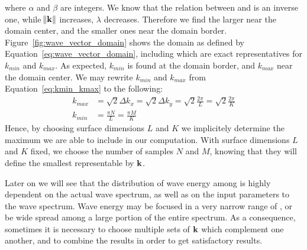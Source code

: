 where $\alpha$ and $\beta$ are integers.
%
We know that the relation between \wavelength and \wavenumber is an inverse one,
while $\norm{\mathbf{k}}$ increases, \wavelength $\lambda$ decreases. Therefore we find the larger
\wavelengths near the domain center, and the smaller ones near the domain border.
Figure~\ref{fig:wave_vector_domain} shows the \wavevector domain as defined
by Equation~\ref{eq:wave_vector_domain}, including \wavevectors which are exact
representatives for \wavenumbers $k_{min}$ and $k_{max}$. As expected, $k_{min}$
is found at the domain border, and $k_{max}$ near the domain center.
We may rewrite \wavenumbers $k_{min}$ and $k_{max}$ from
Equation~\ref{eq:kmin_kmax} to the following:
\begin{align*}
 k_{max} &= \sqrt{2}\Delta k_x = \sqrt{2}\Delta k_y = \sqrt{2}\frac{2\pi}{L} = \sqrt{2}\frac{2\pi}{K} \\
 k_{min} &= \frac{\pi N}{L} = \frac{\pi M}{K}
\end{align*}
Hence, by choosing surface dimensions $L$ and $K$ we implicitely determine the 
maximum \wavelength we are able to include in our computation.
With surface dimensions $L$ and $K$ fixed, we choose the number of 
samples $N$ and $M$, knowing that they will define the smallest \wavelength 
representable by \wavevectors $\mathbf{k}$.

Later on we will see that the 
distribution of wave energy among \wavevectors is highly dependent on the 
actual wave spectrum, as well as on the input parameters to the wave spectrum.
Wave energy may be focused in a very narrow range of \wavevectors, or be wide spread 
among a large portion of the entire \wavevector spectrum. As a consequence, 
sometimes it is necessary to choose multiple sets of \wavevectors 
$\mathbf{k}$ which complement one another, and to combine the results in order 
to get satisfactory results.
%
